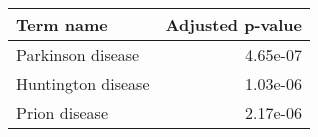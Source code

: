 \begin{tabular}{lr}
\toprule
         Term name &  Adjusted p-value \\
\midrule
 Parkinson disease &          4.65e-07 \\
Huntington disease &          1.03e-06 \\
     Prion disease &          2.17e-06 \\
\bottomrule
\end{tabular}
